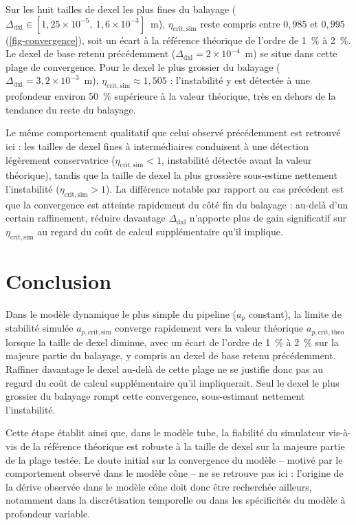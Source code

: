\documentclass[
    11pt,
    a4paper
]{article}
\newcommand{\ap}{a_p}
\newcommand{\apcrittheo}{a_{p,\mathrm{crit,theo}}}
\newcommand{\apcritsim}{a_{p,\mathrm{crit,sim}}}
\newcommand{\dxlsize}{\Delta_{\mathrm{dxl}}}
\newcommand{\etac}{\eta_{\mathrm{crit,sim}}}
\begin{document}
Sur les huit tailles de dexel les plus fines du balayage
(\(\dxlsize \in [1,25\times10^{-5},\ 1,6\times10^{-3}]\)~m), \(\etac\) reste compris entre
\(0,985\) et \(0,995\) (\cref{fig-convergence}), soit un écart à la référence théorique de
l'ordre de \SI{1}{\percent} à \SI{2}{\percent}. Le dexel de base retenu précédemment
(\(\dxlsize = 2\times10^{-4}\)~m) se situe dans cette plage de convergence. Pour le dexel le
plus grossier du balayage (\(\dxlsize = 3,2\times10^{-3}\)~m), \(\etac \approx 1,505\) :
l'instabilité y est détectée à une profondeur environ \SI{50}{\percent} supérieure à la
valeur théorique, très en dehors de la tendance du reste du balayage.

Le même comportement qualitatif que celui observé précédemment est retrouvé ici : les
tailles de dexel fines à intermédiaires conduisent à une détection légèrement conservatrice
(\(\etac < 1\), instabilité détectée avant la valeur théorique), tandis que la taille de
dexel la plus grossière sous-estime nettement l'instabilité (\(\etac > 1\)). La différence
notable par rapport au cas précédent est que la convergence est atteinte rapidement du côté fin du
balayage : au-delà d'un certain raffinement, réduire davantage \(\dxlsize\) n'apporte plus
de gain significatif sur \(\etac\) au regard du coût de calcul supplémentaire qu'il
implique.

\section{Conclusion}
\label{sec-conclusion}

Dans le modèle dynamique le plus simple du pipeline (\(\ap\) constant), la limite de
stabilité simulée \(\apcritsim\) converge rapidement vers la valeur théorique \(\apcrittheo\)
lorsque la taille de dexel diminue, avec un écart de l'ordre de \SI{1}{\percent} à
\SI{2}{\percent} sur la majeure partie du balayage, y compris au dexel de base retenu
précédemment. Raffiner davantage le dexel au-delà de cette plage ne se justifie donc pas au
regard du coût de calcul supplémentaire qu'il impliquerait. Seul le dexel le plus grossier
du balayage rompt cette convergence, sous-estimant nettement l'instabilité.

Cette étape établit ainsi que, dans le modèle tube, la fiabilité du simulateur vis-à-vis de
la référence théorique est robuste à la taille de dexel sur la majeure partie de la plage
testée. Le doute initial sur la convergence du modèle -- motivé par le comportement observé
dans le modèle cône -- ne se retrouve pas ici : l'origine de la dérive observée dans le
modèle cône doit donc être recherchée ailleurs, notamment dans la discrétisation temporelle
ou dans les spécificités du modèle à profondeur variable.

\end{document}
